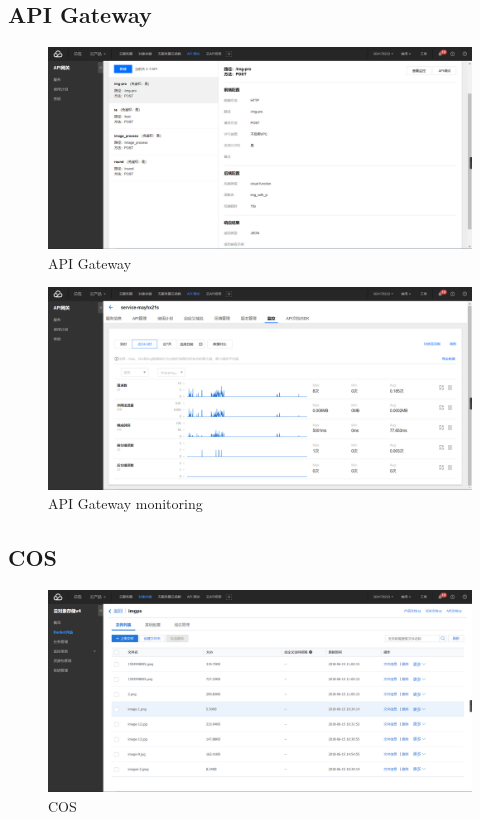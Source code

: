 \documentclass[a4paper,12pt]{article}
\begin{document}
\subsection{API Gateway}

\begin{figure}[H]
\centering
\includegraphics[scale=0.21]{figures/API-gateway2.png}
\caption{\label{fig:apigateway2}API Gateway}
\end{figure}

\begin{figure}[H]
\centering
\includegraphics[scale=0.21]{figures/API-gateway1.png}
\caption{\label{fig:apigateway1}API Gateway monitoring}
\end{figure}


\subsection{COS}

\begin{figure}[H]
\centering
\includegraphics[scale=0.21]{figures/COS1.png}
\caption{\label{fig:cos1}COS}
\end{figure}
\end{document}
